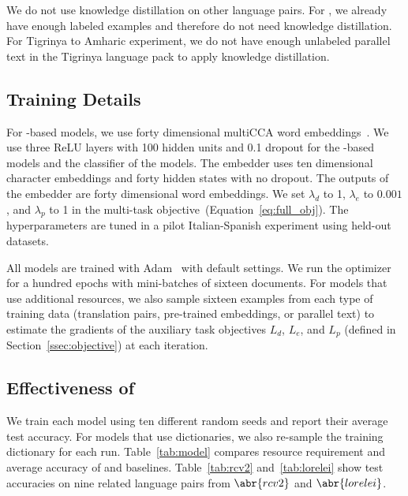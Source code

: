 We do not use knowledge distillation on other language pairs.
For , we already have enough labeled examples and therefore do not
need knowledge distillation.
For Tigrinya to Amharic  experiment, we do not have enough unlabeled
parallel text in the Tigrinya language pack to apply knowledge distillation.

\subsection{Training Details}
\label{sec:hyperparameter}

For -based models, we use forty dimensional multiCCA
word embeddings~\citep{ammar-16}. 
We use three ReLU layers with 100 hidden units and 0.1 dropout for the
-based  models and the  classifier of the \name{}
models.
The  embedder uses ten dimensional character embeddings and forty
hidden states with no dropout.  The outputs of the embedder are forty
dimensional word embeddings.
We set $\lambda_d$ to 1, $\lambda_e$ to $0.001$, and $\lambda_p$ to 1 in the
multi-task objective~(Equation~\ref{eq:full_obj}).
The hyperparameters are tuned in a pilot Italian-Spanish  experiment
using held-out datasets.

All models are trained with Adam~\citep{kingma-15} with default settings.
We run the optimizer for a hundred epochs with mini-batches of sixteen
documents.  For models that use additional resources, we also sample sixteen
examples from each type of training data (translation pairs, pre-trained
embeddings, or parallel text) to estimate the gradients of the auxiliary task
objectives $L_d$, $L_e$, and $L_p$ (defined in Section~\ref{ssec:objective}) at each
iteration.

\subsection{Effectiveness of \name{}}\label{ssec:analysis}
 
We train each model using ten different random seeds and report their average
test accuracy.
For models that use dictionaries, we also re-sample the training dictionary for
each run.
Table~\ref{tab:model} compares resource requirement and average 
accuracy of \name{} and baselines.
Table~\ref{tab:rcv2} and~\ref{tab:lorelei} show test accuracies on nine related
language pairs from $\abr{rcv2}$ and $\abr{lorelei}$.

